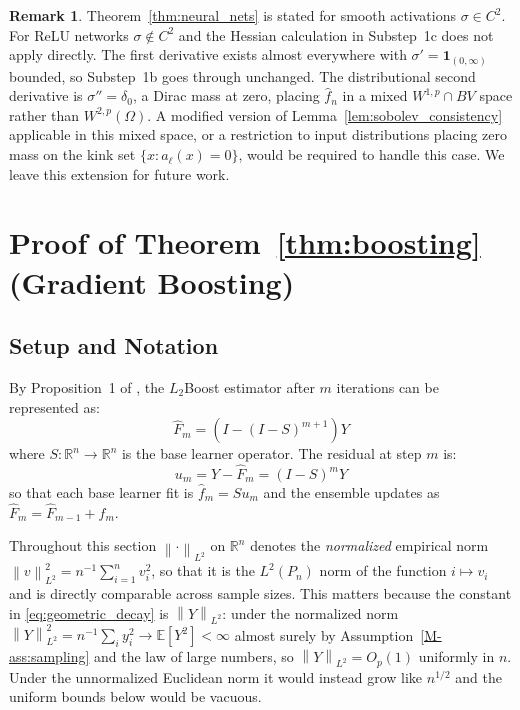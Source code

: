 \documentclass[12pt,a4paper]{article}
\numberwithin{equation}{section}
\theoremstyle{plain}
\theoremstyle{definition}
\newtheorem{remark}{Remark}
\newcommand{\norm}[1]{\left\| #1 \right\|}
\newcommand{\R}{\mathbb{R}}
\newcommand{\E}{\mathbb{E}}
\newcommand{\Wtwop}{W^{2,p}(\Omega)}
\newcommand{\fn}{\hat{f}_n}
\begin{document}
	\begin{remark}
		Theorem~\ref{thm:neural_nets} is stated for smooth activations $\sigma \in
		C^2$. For ReLU networks $\sigma \notin C^2$ and the Hessian calculation in
		Substep~1c does not apply directly. The first derivative exists almost
		everywhere with $\sigma' = \mathbf{1}_{(0,\infty)}$ bounded, so Substep~1b
		goes through unchanged. The distributional second derivative is $\sigma'' =
		\delta_0$, a Dirac mass at zero, placing $\fn$ in a mixed $W^{1,p} \cap BV$
		space rather than $\Wtwop$. A modified version of
		Lemma~\ref{lem:sobolev_consistency} applicable in this mixed space, or a
		restriction to input distributions placing zero mass on the kink set
		$\{x : a_\ell(x) = 0\}$, would be required to handle this case. We leave
		this extension for future work.
	\end{remark}
	
	\section{Proof of Theorem~\ref{thm:boosting} (Gradient Boosting)}
	\label{app:boosting}
	
	\subsection{Setup and Notation}
	
	By Proposition~1 of \citet{buhlmann2003boosting}, the $L_2$Boost estimator after
	$m$ iterations can be represented as:
	\begin{equation}
		\hat{F}_m = (I - (I-S)^{m+1})Y
	\end{equation}
	where $S: \mathbb{R}^n \to \mathbb{R}^n$ is the base learner operator. The residual
	at step $m$ is:
	\begin{equation}
		u_m = Y - \hat{F}_m = (I-S)^m Y
	\end{equation}
	so that each base learner fit is $\hat{f}_m = Su_m$ and the ensemble updates as
	$\hat{F}_m = \hat{F}_{m-1} + \hat{f}_m$.

	Throughout this section $\norm{\cdot}_{L^2}$ on $\R^n$ denotes the
	\emph{normalized} empirical norm $\norm{v}_{L^2}^2 = n^{-1}\sum_{i=1}^n v_i^2$,
	so that it is the $L^2(P_n)$ norm of the function $i \mapsto v_i$ and is
	directly comparable across sample sizes. This matters because the constant
	in \eqref{eq:geometric_decay} is $\norm{Y}_{L^2}$: under the normalized norm
	$\norm{Y}_{L^2}^2 = n^{-1}\sum_i y_i^2 \to \E[Y^2] < \infty$ almost surely
	by Assumption~\ref{M-ass:sampling} and the law of large numbers, so
	$\norm{Y}_{L^2} = O_p(1)$ uniformly in $n$. Under the unnormalized Euclidean
	norm it would instead grow like $n^{1/2}$ and the uniform bounds below
	would be vacuous.
\end{document}
